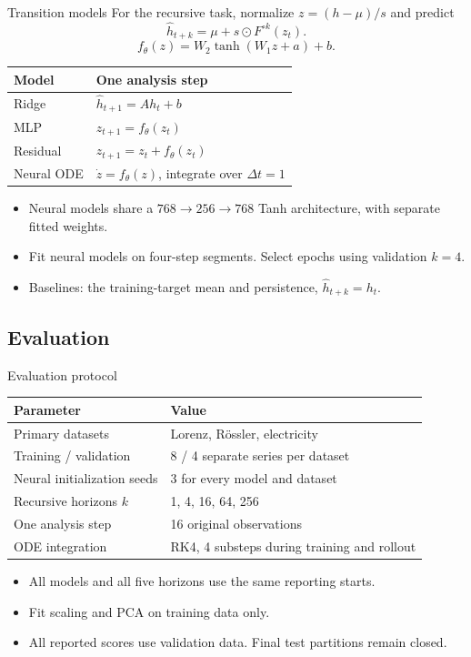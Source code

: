 \documentclass[aspectratio=169,11pt]{beamer}
\begin{document}
\begin{frame}{Transition models}
For the recursive task, normalize $z=(h-\mu)/s$ and predict
\[\widehat h_{t+k}=\mu+s\odot F^{\circ k}(z_t).\]
\[
 f_\theta(z)=W_2\tanh(W_1z+a)+b.
\]
\begin{table}
\centering
\begin{tabular}{ll}
\toprule
Model & One analysis step \\
\midrule
Ridge & $\widehat h_{t+1}=Ah_t+b$ \\
MLP & $z_{t+1}=f_\theta(z_t)$ \\
Residual & $z_{t+1}=z_t+f_\theta(z_t)$ \\
Neural ODE & $\dot z=f_\theta(z)$, integrate over $\Delta t=1$ \\
\bottomrule
\end{tabular}
\end{table}
\begin{itemize}
\item Neural models share a $768\to256\to768$ Tanh architecture, with separate fitted weights.
\item Fit neural models on four-step segments. Select epochs using validation $k=4$.
\item Baselines: the training-target mean and persistence, $\widehat h_{t+k}=h_t$.
\end{itemize}
\end{frame}

\subsection{Evaluation}
\begin{frame}{Evaluation protocol}
\begin{table}
\centering
\begin{tabular}{ll}
\toprule
Parameter & Value \\
\midrule
Primary datasets & Lorenz, R\"ossler, electricity \\
Training / validation & 8 / 4 separate series per dataset \\
Neural initialization seeds & 3 for every model and dataset \\
Recursive horizons $k$ & 1, 4, 16, 64, 256 \\
One analysis step & 16 original observations \\
ODE integration & RK4, 4 substeps during training and rollout \\
\bottomrule
\end{tabular}
\end{table}
\begin{itemize}
\item All models and all five horizons use the same reporting starts.
\item Fit scaling and PCA on training data only.
\item All reported scores use validation data. Final test partitions remain closed.
\end{itemize}
\end{frame}
\end{document}
